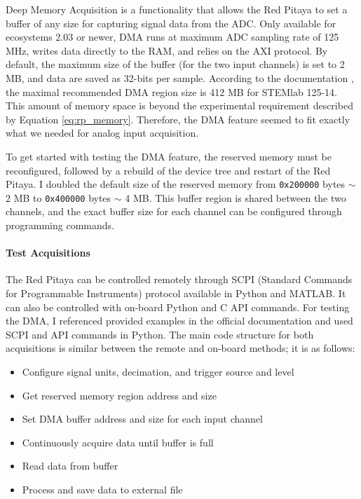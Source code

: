 Deep Memory Acquisition is a functionality that allows the Red Pitaya to set a buffer of any size for capturing signal data from the ADC. Only available for ecosystems 2.03 or newer, DMA runs at maximum ADC sampling rate of 125 MHz, writes data directly to the RAM, and relies on the AXI protocol. By default, the maximum size of the buffer (for the two input channels) is set to 2 MB, and data are saved as 32-bits per sample. According to the documentation \cite{rp}, the maximal recommended DMA region size is 412 MB for STEMlab 125-14. This amount of memory space is beyond the experimental requirement described by Equation \eqref{eq:rp_memory}. Therefore, the DMA feature seemed to fit exactly what we needed for analog input acquisition.

To get started with testing the DMA feature, the reserved memory must be reconfigured, followed by a rebuild of the device tree and restart of the Red Pitaya. I doubled the default size of the reserved memory from \texttt{0x200000} bytes $\sim$ 2 MB to \texttt{0x400000} bytes $\sim$ 4 MB. This buffer region is shared between the two channels, and the exact buffer size for each channel can be configured through programming commands.


\paragraph{Test Acquisitions}

The Red Pitaya can be controlled remotely through SCPI (Standard Commands for Programmable Instruments) protocol available in Python and MATLAB. It can also be controlled with on-board Python and C API commands. For testing the DMA, I referenced provided examples in the official documentation and used SCPI and API commands in Python. The main code structure for both acquisitions is similar between the remote and on-board methods; it is as follows:

\begin{itemize}\setlength{\itemsep}{1pt}
    \item Configure signal units, decimation, and trigger source and level
    \item Get reserved memory region address and size
    \item Set DMA buffer address and size for each input channel
    \item Continuously acquire data until buffer is full
    \item Read data from buffer
    \item Process and save data to external file
\end{itemize}

